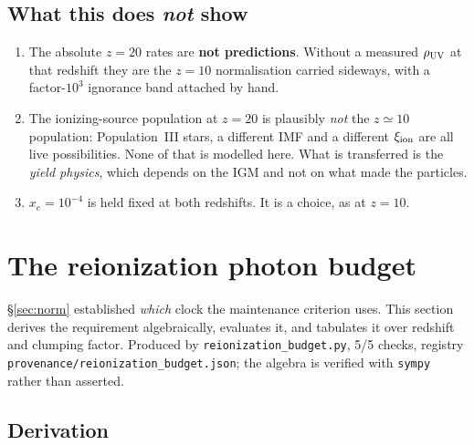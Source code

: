 \documentclass[11pt,a4paper]{article}
\begin{document}
\subsection{What this does \emph{not} show}
\begin{enumerate}\itemsep2pt
\item The absolute $z=20$ rates are \textbf{not predictions}. Without a
      measured $\rho_{\rm UV}$ at that redshift they are the $z=10$
      normalisation carried sideways, with a factor-$10^{3}$ ignorance band
      attached by hand.
\item The ionizing-source population at $z=20$ is plausibly \emph{not} the
      $z\simeq10$ population: Population~III stars, a different IMF and a
      different $\xi_{\rm ion}$ are all live possibilities. None of that is
      modelled here. What is transferred is the \emph{yield physics}, which
      depends on the IGM and not on what made the particles.
\item $x_e=10^{-4}$ is held fixed at both redshifts. It is a choice, as at
      $z=10$.
\end{enumerate}

\clearpage
\section{The reionization photon budget}\label{sec:budget}
\S\ref{sec:norm} established \emph{which} clock the maintenance criterion uses.
This section derives the requirement algebraically, evaluates it, and tabulates
it over redshift and clumping factor. Produced by
\texttt{reionization\_budget.py}, 5/5 checks, registry
\texttt{provenance/reionization\_budget.json}; the algebra is verified with
\texttt{sympy} rather than asserted.

\subsection{Derivation}
\end{document}
